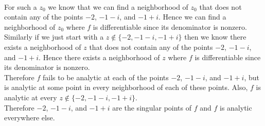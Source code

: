 \documentclass{article}
\begin{document}
\begin{center}
    \\For such a $z_0$ we know that we can find a neighborhood of $z_0$ that does not contain any of the points $-2$, $-1 - i$, and $-1 + i$. Hence we can find a neighborhood of $z_0$ where $f$ is differentiable since its denominator is nonzero.
    \break
    \\Similarly if we just start with a $z\notin\{-2, -1 - i, -1 + i\}$ then we know there exists a neighborhood of $z$ that does not contain any of the points $-2$, $-1 - i$, and $-1 + i$. Hence there exists a neighborhood of $z$ where $f$ is differentiable since its denominator is nonzero.
    \break
    \\Therefore $f$ fails to be analytic at each of the points $-2$, $-1 - i$, and $-1 + i$, but is analytic at some point in every neighborhood of each of these points. Also, $f$ is analytic at every $z\notin\{-2, -1 - i, -1 + i\}$.
    \\Therefore $-2$, $-1 - i$, and $-1 + i$ are the singular points of $f$ and $f$ is analytic everywhere else. \qedsymbol
\end{center}


\newpage
\end{document}
